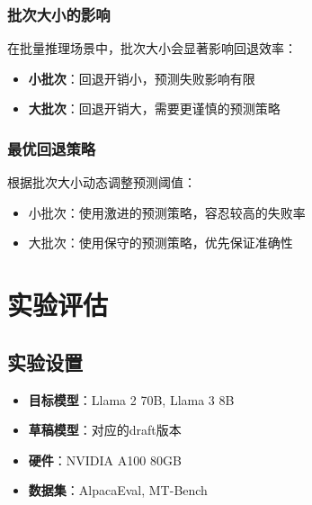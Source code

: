 \documentclass[11pt,a4paper]{article}
\newcommand{\hlblue}[1]{\textcolor{primaryblue}{\textbf{#1}}}
\newcommand{\hlorange}[1]{\textcolor{accentorange}{\textbf{#1}}}
\begin{document}
\subsubsection{批次大小的影响}

在批量推理场景中，批次大小会显著影响回退效率：

\begin{itemize}
  \item \hlblue{小批次}：回退开销小，预测失败影响有限
  \item \hlorange{大批次}：回退开销大，需要更谨慎的预测策略
\end{itemize}

\subsubsection{最优回退策略}

\begin{innovationbox}[批次感知回退]
  根据批次大小动态调整预测阈值：
  \begin{itemize}
    \item 小批次：使用激进的预测策略，容忍较高的失败率
    \item 大批次：使用保守的预测策略，优先保证准确性
  \end{itemize}
\end{innovationbox}

\newpage

\section{实验评估}

\subsection{实验设置}

\begin{infobox}[实验配置]
  \begin{itemize}
    \item \textbf{目标模型}：Llama 2 70B, Llama 3 8B
    \item \textbf{草稿模型}：对应的draft版本
    \item \textbf{硬件}：NVIDIA A100 80GB
    \item \textbf{数据集}：AlpacaEval, MT-Bench
  \end{itemize}
\end{infobox}
\end{document}
